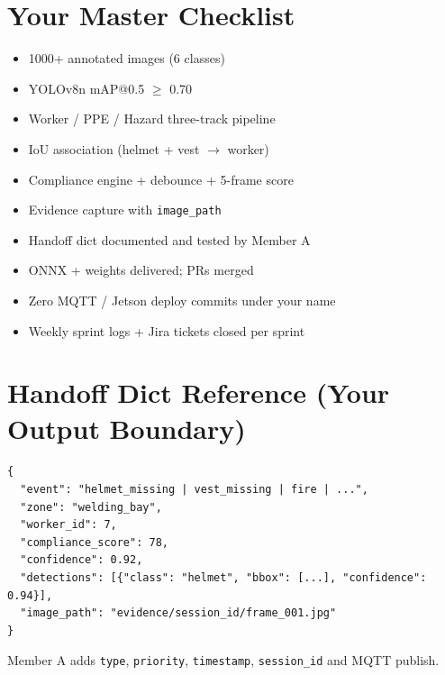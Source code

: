 \documentclass[12pt,a4paper]{article}
\begin{document}
\section{Your Master Checklist}

\begin{itemize}
    \item[$\square$] 1000+ annotated images (6 classes)
    \item[$\square$] YOLOv8n mAP@0.5 $\geq$ 0.70
    \item[$\square$] Worker / PPE / Hazard three-track pipeline
    \item[$\square$] IoU association (helmet + vest $\rightarrow$ worker)
    \item[$\square$] Compliance engine + debounce + 5-frame score
    \item[$\square$] Evidence capture with \texttt{image\_path}
    \item[$\square$] Handoff dict documented and tested by Member A
    \item[$\square$] ONNX + weights delivered; PRs merged
    \item[$\square$] Zero MQTT / Jetson deploy commits under your name
    \item[$\square$] Weekly sprint logs + Jira tickets closed per sprint
\end{itemize}

\section{Handoff Dict Reference (Your Output Boundary)}

\begin{verbatim}
{
  "event": "helmet_missing | vest_missing | fire | ...",
  "zone": "welding_bay",
  "worker_id": 7,
  "compliance_score": 78,
  "confidence": 0.92,
  "detections": [{"class": "helmet", "bbox": [...], "confidence": 0.94}],
  "image_path": "evidence/session_id/frame_001.jpg"
}
\end{verbatim}

Member A adds \texttt{type}, \texttt{priority}, \texttt{timestamp}, \texttt{session\_id} and MQTT publish.
\end{document}
